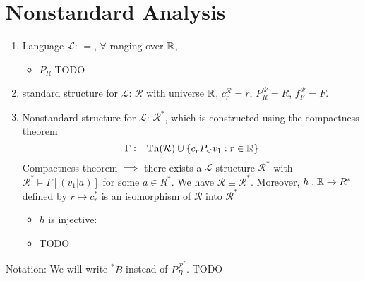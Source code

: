 \section{Nonstandard Analysis}
\begin{enumerate}
    \item Language $\mathcal{L}$: $=$, $\forall$ ranging over $\mathbb{R}$,
    \begin{itemize}
        \item $P_R$ TODO
    \end{itemize}
    \item standard structure for $\mathcal{L}$: $\mathcal{R}$ with universe $\mathbb{R}$, $c_r^\mathcal{R} = r$, $P_R^\mathcal{R} = R$, $f^\mathcal{R}_F = F$.
    \item Nonstandard structure for $\mathcal{L}$: $\mathcal{R}^*$, which is constructed using the compactness theorem 
    \[\Gamma \vcentcolon= \operatorname{Th}(\mathcal{R}) \cup \{c_r P_< v_1 : r\in \mathbb{R}\}\]
    Compactness theorem $\implies$ there exists a $\mathcal{L}$-structure $\mathcal{R}^*$ with $\mathcal{R}^*\models \Gamma [(v_1 | a)]$ for some $a\in R^*$. We have $\mathcal{R}\equiv \mathcal{R}^*$.
    Moreover, $h: \mathbb{R} \to R^*$ defined by $r\mapsto c_r^*$ is an isomorphism of $\mathcal{R}$ into $\mathcal{R}^*$
    \begin{itemize}
        \item $h$ is injective:
        \item TODO
    \end{itemize}
\end{enumerate}
Notation: We will write $\!^*B$ instead of $P_B^{\mathcal{R}^*}$.
TODO

